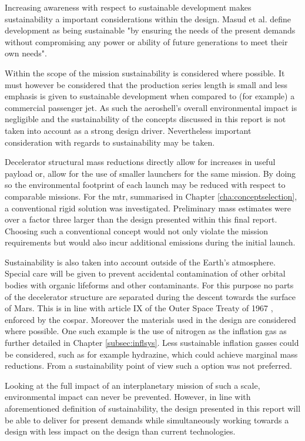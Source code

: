 Increasing awareness with respect to sustainable development makes sustainability a important considerations within the design. Masud et al. define development as being sustainable "by ensuring the needs of the present demands without compromising any power or ability of future generations to meet their own needs"\cite[p.85]{Masud2011}. 

Within the scope of the mission sustainability is considered where possible. It must however be considered that the production series length is small and less emphasis is given to sustainable development when compared to (for example) a commercial passenger jet. As such the aeroshell's overall environmental impact is negligible and the sustainability of the concepts discussed in this report is not taken into account as a strong design driver. Nevertheless important consideration with regards to sustainability may be taken. 

Decelerator structural mass reductions directly allow for increases in useful payload or, allow for the use of smaller launchers for the same mission. By doing so the environmental footprint of each launch may be reduced with respect to comparable missions. For the \gls{mtr}, summarised in Chapter \ref{cha:conceptselection},  a conventional rigid solution was investigated. Preliminary mass estimates were over a factor three larger than the design presented within this final report. Choosing such a conventional concept would not only violate the mission requirements but would also incur additional emissions during the initial launch.

Sustainability is also taken into account outside of the Earth's atmosphere. Special care will be given to prevent accidental contamination of other orbital bodies with organic lifeforms and other contaminants. For this purpose no parts of the decelerator structure are separated during the descent towards the surface of Mars. This is in line with article IX of the Outer Space Treaty of 1967 \cite{UnitedNations2008}, enforced by the \gls{cospar}. Moreover the materials used in the design are considered where possible. One such example is the use of nitrogen as the inflation gas as further detailed in Chapter \ref{subsec:inflsys}. Less sustainable inflation gasses could be considered, such as for example hydrazine, which could achieve marginal mass reductions. From a sustainability point of view such a option was not preferred.

Looking at the full impact of an interplanetary mission of such a scale, environmental impact can never be prevented. However, in line with aforementioned definition of sustainability, the design presented in this report will be able to deliver for present demands while simultaneously working towards a design with less impact on the design than current technologies.

